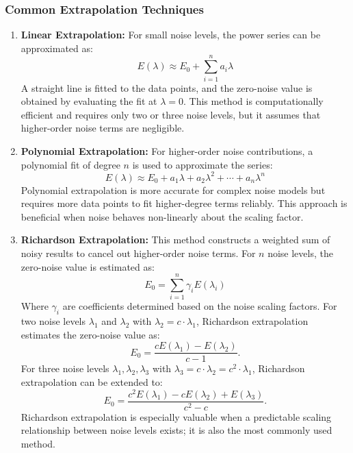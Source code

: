 \documentclass[12pt]{article}
\begin{document}
\subsubsection{Common Extrapolation Techniques}
\begin{enumerate}
    \item \textbf{Linear Extrapolation:} For small noise levels, the power series can be approximated as:
    \begin{equation}
    E(\lambda) \approx E_0 + \sum_{i=1}^{n}a_i \lambda \tag{14.1} \label{eq:14.1}
    \end{equation}
    A straight line is fitted to the data points, and the zero-noise value is obtained by evaluating the fit at $\lambda = 0$. This method is computationally efficient and requires only two or three noise levels, but it assumes that higher-order noise terms are negligible.

    \item \textbf{Polynomial Extrapolation:} For higher-order noise contributions, a polynomial fit of degree $n$ is used to approximate the series:
    \begin{equation}
    E(\lambda) \approx E_0 + a_1 \lambda + a_2 \lambda^2 + \cdots + a_n \lambda^n \tag{14.2} \label{eq:14.2}
    \end{equation}
Polynomial extrapolation is more accurate for complex noise models but requires more data points to fit higher-degree terms reliably. This approach is beneficial when noise behaves non-linearly about the scaling factor.

    \item \textbf{Richardson Extrapolation:} This method constructs a weighted sum of noisy results to cancel out higher-order noise terms. For $n$ noise levels, the zero-noise value is estimated as:
    \[
    E_0 = \sum_{i=1}^{n} \gamma_i E(\lambda_i) \tag{15} \label{eq:15}
    \]
    Where $\gamma_i$ are coefficients determined based on the noise scaling factors. For two noise levels $\lambda_1$ and $\lambda_2$ with $\lambda_2 = c \cdot \lambda_1$, Richardson extrapolation estimates the zero-noise value as:
    \[
    E_0 = \frac{c E(\lambda_1) - E(\lambda_2)}{c - 1}. \tag{16} \label{eq:16}
    \]
    For three noise levels $\lambda_1, \lambda_2, \lambda_3$ with $\lambda_3 = c \cdot \lambda_2 = c^2 \cdot \lambda_1$, Richardson extrapolation can be extended to:
    \[
    E_0 = \frac{c^2 E(\lambda_1) - c E(\lambda_2) + E(\lambda_3)}{c^2 - c}. \tag{16.1} \label{eq:16.1}
    \]
    Richardson extrapolation is especially valuable when a predictable scaling relationship between noise levels exists; it is also the most commonly used method.


\end{enumerate}
\end{document}

